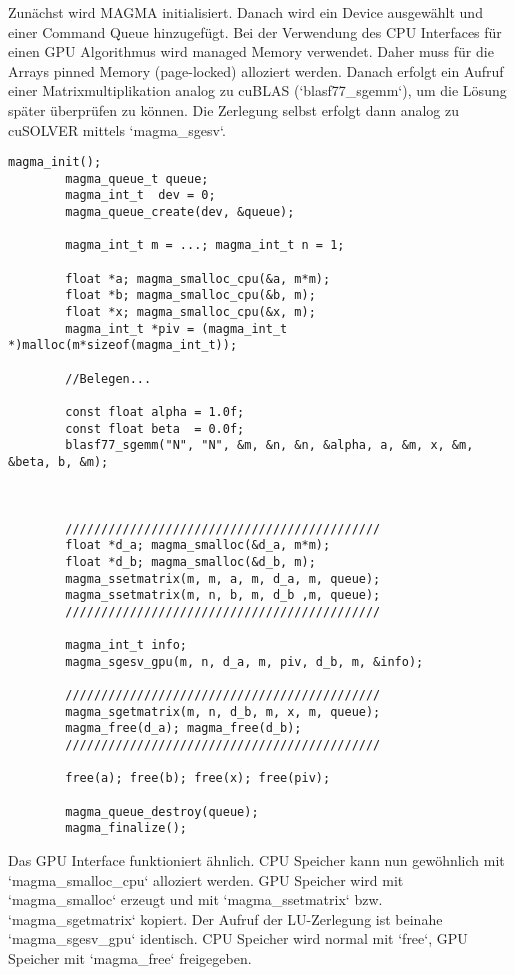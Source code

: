 		Zunächst wird MAGMA initialisiert. Danach wird ein Device ausgewählt und einer Command Queue hinzugefügt. Bei der Verwendung des CPU Interfaces für einen GPU Algorithmus wird managed Memory verwendet. Daher muss für die Arrays pinned Memory (page-locked) alloziert werden. Danach erfolgt ein Aufruf einer Matrixmultiplikation analog zu cuBLAS (\li`blasf77_sgemm`), um die Lösung später überprüfen zu können. Die Zerlegung selbst erfolgt dann analog zu cuSOLVER mittels \li`magma_sgesv`.	
		\begin{lstlisting}[caption=MAGMA: GPU-Interface]
		magma_init();
		magma_queue_t queue;
		magma_int_t  dev = 0;
		magma_queue_create(dev, &queue);
  
		magma_int_t m = ...; magma_int_t n = 1;
                      
		float *a; magma_smalloc_cpu(&a, m*m);   
		float *b; magma_smalloc_cpu(&b, m);  
		float *x; magma_smalloc_cpu(&x, m);   
		magma_int_t *piv = (magma_int_t *)malloc(m*sizeof(magma_int_t));
		
		//Belegen...

		const float alpha = 1.0f;
		const float beta  = 0.0f;
		blasf77_sgemm("N", "N", &m, &n, &n, &alpha, a, &m, x, &m, &beta, b, &m);



		////////////////////////////////////////////
		float *d_a; magma_smalloc(&d_a, m*m);
		float *d_b; magma_smalloc(&d_b, m);		
		magma_ssetmatrix(m, m, a, m, d_a, m, queue);
		magma_ssetmatrix(m, n, b, m, d_b ,m, queue);
		////////////////////////////////////////////

		magma_int_t info;
		magma_sgesv_gpu(m, n, d_a, m, piv, d_b, m, &info);
		
		////////////////////////////////////////////
		magma_sgetmatrix(m, n, d_b, m, x, m, queue);
		magma_free(d_a); magma_free(d_b);
		////////////////////////////////////////////
		
		free(a); free(b); free(x); free(piv);
		
		magma_queue_destroy(queue);
		magma_finalize();
		\end{lstlisting}
		
		Das GPU Interface funktioniert ähnlich. CPU Speicher kann nun gewöhnlich mit \li`magma_smalloc_cpu` alloziert werden. GPU Speicher wird mit \li`magma_smalloc` erzeugt und mit \li`magma_ssetmatrix` bzw. \li`magma_sgetmatrix` kopiert. Der Aufruf der LU-Zerlegung ist beinahe \li`magma_sgesv_gpu` identisch. CPU Speicher wird normal mit \li`free`, GPU Speicher mit \li`magma_free` freigegeben.	
		
